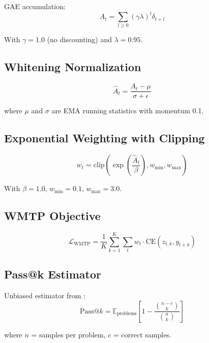 GAE accumulation:
\begin{equation}
    A_t = \sum_{l \geq 0} (\gamma\lambda)^l \delta_{t+l}
\end{equation}

With $\gamma = 1.0$ (no discounting) and $\lambda = 0.95$.

\subsection{Whitening Normalization}

\begin{equation}
    \hat{A}_t = \frac{A_t - \mu}{\sigma + \epsilon}
\end{equation}

where $\mu$ and $\sigma$ are EMA running statistics with momentum 0.1.

\subsection{Exponential Weighting with Clipping}

\begin{equation}
    w_t = \text{clip}\left(\exp\left(\frac{\hat{A}_t}{\beta}\right), w_{\min}, w_{\max}\right)
\end{equation}

With $\beta = 1.0$, $w_{\min} = 0.1$, $w_{\max} = 3.0$.

\subsection{WMTP Objective}

\begin{equation}
    \mathcal{L}_{\text{WMTP}} = \frac{1}{K} \sum_{k=1}^{K} \sum_t w_t \cdot \text{CE}(z_{t,k}, y_{t+k})
\end{equation}

\subsection{Pass@k Estimator}

Unbiased estimator from \citet{chen2021evaluating}:
\begin{equation}
    \text{Pass@}k = \mathbb{E}_{\text{problems}} \left[ 1 - \frac{\binom{n-c}{k}}{\binom{n}{k}} \right]
\end{equation}

where $n$ = samples per problem, $c$ = correct samples.

